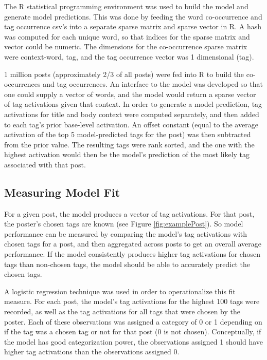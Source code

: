 \documentclass[10pt,letterpaper]{article}
\begin{document}
The R statistical programming environment was used to build the model and generate model predictions.
This was done by feeding the word co-occurrence and tag occurrence csv's into a separate sparse matrix and sparse vector in R.
A hash was computed for each unique word, so that indices for the sparse matrix and vector could be numeric.
The dimensions for the co-occurrence sparse matrix were context-word, tag, and the tag occurrence vector was 1 dimensional (tag).

1 million posts (approximately 2/3 of all posts) were fed into R to build the co-occurrences and tag occurrences.
An interface to the model was developed so that one could supply a vector of words, and the model would return a sparse vector of tag activations given that context.
In order to generate a model prediction, tag activations for title and body context were computed separately, and then added to each tag's prior base-level activation.
An offset constant (equal to the average activation of the top 5 model-predicted tags for the post) was then subtracted from the prior value.
The resulting tags were rank sorted, and the one with the highest activation would then be the model's prediction of the most likely tag associated with that post.

\subsection{Measuring Model Fit}

For a given post, the model produces a vector of tag activations.
For that post, the poster's chosen tags are known (see Figure \ref{fig:examplePost}).
So model performance can be measured by comparing the model's tag activations with chosen tags for a post, and then aggregated across posts to get an overall average performance.
If the model consistently produces higher tag activations for chosen tags than non-chosen tags, the model should be able to accurately predict the chosen tags.

A logistic regression technique was used in order to operationalize this fit measure.
For each post, the model's tag activations for the highest 100 tags were recorded, as well as the tag activations for all tags that were chosen by the poster.
Each of these observations was assigned a category of 0 or 1 depending on if the tag was a chosen tag or not for that post (0 is not chosen).
Conceptually, if the model has good categorization power, the observations assigned 1 should have higher tag activations than the observations assigned 0.
\end{document}
